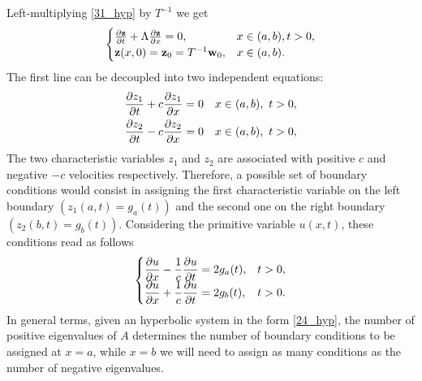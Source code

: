 Left-multiplying \eqref{31_hyp} by \(T^{-1}\) we get 
\begin{equation}
    \begin{cases}
        \partialderivative{\vect{z}}{t} + \Lambda \partialderivative{\vect{z}}{x} = 0, & x \in (a,b), t > 0, \\
        \vect{z}(x,0) = \vect{z}_0 = T^{-1} \vect{w}_0, & x \in (a,b).
    \end{cases}
    \label{32_hyp}
\end{equation}
The first line can be decoupled into two independent equations: 
\begin{align*}
    &\partialderivative{z_1}{t} + c \partialderivative{z_1}{x} = 0  & x\in (a,b), \ t >0, \\
    &\partialderivative{z_2}{t} - c \partialderivative{z_2}{x} = 0  & x\in (a,b), \ t >0, \\
\end{align*}
The two characteristic variables \(z_1\) and \(z_2\) are associated with positive \(c\) and negative \(-c\) velocities respectively. 
Therefore, a possible set of boundary conditions would consist in assigning the first characteristic variable on the left boundary \((z_1(a,t) = g_a(t))\) and the second one on the right boundary \((z_2(b, t)=g_b(t))\). Considering the primitive variable \(u(x,t)\), these conditions read as follows 
\begin{equation}
    \begin{cases}
        \displaystyle \partialderivative{u}{x}(a,t) -\frac{1}{c}\partialderivative{u}{t}(a,t) = 2 g_a (t), & t > 0, \\
        \displaystyle  \partialderivative{u}{x}(b,t) + \frac{1}{c} \partialderivative{u}{t}(b,t) = 2 g_b (t), & t> 0.
    \end{cases}
    \label{33_hyp}
\end{equation}
In general terms, given an hyperbolic system in the form \eqref{24_hyp}, the number of positive eigenvalues of \(A\) determines the number of boundary conditions to be assigned at \(x=a\), while \(x=b\) we will need to assign as many conditions as the number of negative eigenvalues. 
